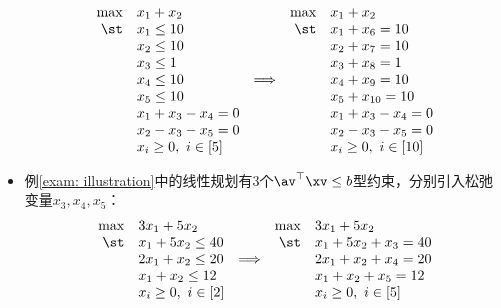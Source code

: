 \documentclass{ctexart}
\begin{document}
\begin{itemize}
          \begin{align}
              \begin{array}{rlcrl} \label{eq: flow-standard}
                  \max & x_1 + x_2              &                 & \max & x_1 + x_2               \\
                  \st  & x_1 \le 10             &                 & \st  & x_1 + x_6 = 10          \\
                       & x_2 \le 10             &                 &      & x_2 + x_7 = 10          \\
                       & x_3 \le 1              &                 &      & x_3 + x_8 = 1           \\
                       & x_4 \le 10             & \Longrightarrow &      & x_4 + x_9 = 10          \\
                       & x_5 \le 10             &                 &      & x_5 + x_{10} = 10       \\
                       & x_1 + x_3 - x_4 = 0    &                 &      & x_1 + x_3 - x_4 = 0     \\
                       & x_2 - x_3 - x_5 = 0    &                 &      & x_2 - x_3 - x_5 = 0     \\
                       & x_i \ge 0, ~ i \in [5] &                 &      & x_i \ge 0, ~ i \in [10]
              \end{array}
          \end{align}
    \item 例\ref{exam: illustration}中的线性规划有$3$个$\av^\top \xv \le b$型约束，分别引入松弛变量$x_3, x_4, x_5$：
          \begin{align}
              \begin{array}{rlcrl} \label{eq: illustration-standard}
                  \max & 3 x_1 + 5 x_2          &                 & \max & 3 x_1 + 5 x_2          \\
                  \st  & x_1 + 5 x_2 \le 40     &                 & \st  & x_1 + 5 x_2 + x_3 = 40 \\
                       & 2 x_1 + x_2 \le 20     & \Longrightarrow &      & 2 x_1 + x_2 + x_4 = 20 \\
                       & x_1 + x_2 \le 12       &                 &      & x_1 + x_2 + x_5 = 12   \\
                       & x_i \ge 0, ~ i \in [2] &                 &      & x_i \ge 0, ~ i \in [5]
              \end{array}
          \end{align}
\end{itemize}
\end{document}
